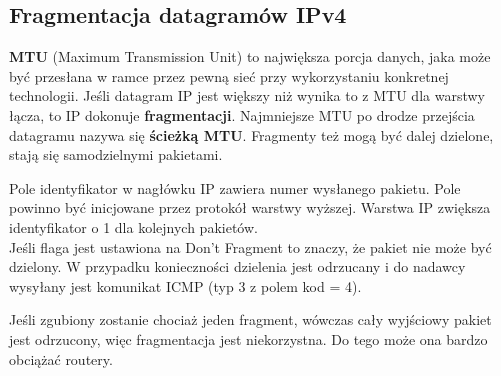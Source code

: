 \documentclass[../main.tex]{subfiles}
\begin{document}
    \subsection{Fragmentacja datagramów IPv4}
    \textbf{MTU} (Maximum Transmission Unit) to największa porcja danych, jaka może być przesłana w ramce przez pewną sieć
    przy wykorzystaniu konkretnej technologii. Jeśli datagram IP jest większy niż wynika to z MTU dla warstwy łącza, to IP dokonuje \textbf{fragmentacji}.
    Najmniejsze MTU po drodze przejścia datagramu nazywa się \textbf{ścieżką MTU}.
    Fragmenty też mogą być dalej dzielone, stają się samodzielnymi pakietami.

    Pole identyfikator w nagłówku IP zawiera numer wysłanego pakietu. Pole powinno być inicjowane przez protokół warstwy wyższej. Warstwa IP zwiększa identyfikator
    o 1 dla kolejnych pakietów.\\

    Jeśli flaga jest ustawiona na Don't Fragment to znaczy, że pakiet nie może być dzielony. W przypadku konieczności dzielenia jest odrzucany i do nadawcy wysyłany jest
    komunikat ICMP (typ 3 z polem kod = 4).

    Jeśli zgubiony zostanie chociaż jeden fragment, wówczas cały wyjściowy pakiet jest odrzucony, więc fragmentacja jest niekorzystna.
    Do tego może ona bardzo obciążać routery.
\end{document}
